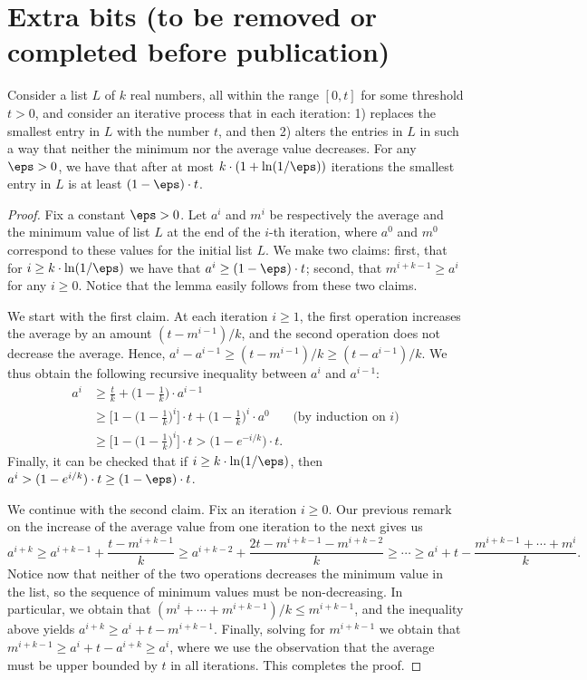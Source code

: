 \section{Extra bits (to be removed or completed before publication)}

\begin{lemma}\label{lem:list}
Consider a list $L$ of $k$ real numbers, all within the range $[0,t]$ for some threshold $t>0$, and consider an iterative process that in each iteration: 
1) replaces the smallest entry in $L$ with the number $t$, and then 2) alters the entries in $L$ in such a way that neither the minimum nor the average value decreases.
For any $\eps>0$, we have that after at most $k\cdot (1+\ln (1/\eps))$ iterations the smallest entry in $L$ is at least $(1-\eps)\cdot t$.
\end{lemma}

\begin{proof}
Fix a constant $\eps>0$. Let $a^i$ and $m^i$ be respectively the average and the minimum value of list $L$ at the end of the $i$-th iteration, where $a^0$ and $m^0$ correspond to these values for the initial list $L$. 
We make two claims: first, that for $i\geq k\cdot \ln(1/\eps)$ we have that $a^i \geq (1-\eps) \cdot t$; 
second, that $m^{i+k-1}\geq a^i$ for any $i\geq 0$. Notice that the lemma easily follows from these two claims.

We start with the first claim. At each iteration $i\geq 1$, the first operation increases the average by an amount $(t - m^{i-1})/k$, and the second operation does not decrease the average. Hence, $a^i - a^{i-1}\geq (t-m^{i-1})/k \geq (t-a^{i-1})/k$. We thus obtain the following recursive inequality between $a^{i}$ and $a^{i-1}$:
\begin{align*}
a^i &\geq \frac{t}{k} + \Big( 1-\frac{1}{k} \Big) \cdot a^{i-1}\\
  &\geq \Big[ 1-\Big( 1-\frac{1}{k} \Big)^i \Big]\cdot t + \Big(1 - \frac{1}{k}\Big)^i\cdot a^0 & \text{(by induction on $i$)} \\
	&\geq \Big[ 1-\Big( 1-\frac{1}{k} \Big)^i \Big]\cdot t 
	 > \big( 1 - e^{-i/k} \big) \cdot t.
\end{align*}
Finally, it can be checked that if $i\geq k\cdot \ln (1/\eps)$, then $a^i > (1 - e^{i/k})\cdot t \geq (1-\eps)\cdot t$. 

We continue with the second claim. Fix an iteration $i\geq 0$. Our previous remark on the increase of the average value from one iteration to the next gives us 
$$a^{i+k}\geq a^{i+k-1} + \frac{t - m^{i+ k -1}}{k} \geq a^{i+ k - 2} + \frac{2t - m^{i+k-1} - m^{i+k-2}}{k} \geq \cdots \geq a^i + t - \frac{m^{i+k-1}+\cdots + m^i}{k}.$$ 
Notice now that neither of the two operations decreases the minimum value in the list, so the sequence of minimum values must be non-decreasing. 
In particular, we obtain that $(m^i + \cdots +m^{i+k-1})/k \leq m^{i+k-1}$, and the inequality above yields $a^{i+k}\geq a^i + t - m^{i+k-1}$.  
Finally, solving for $m^{i+k-1}$ we obtain that $m^{i+k-1}\geq a^i + t - a^{i+k}\geq a^i$, where we use the observation that the average must be upper bounded by $t$ in all iterations. This completes the proof.
\end{proof}

